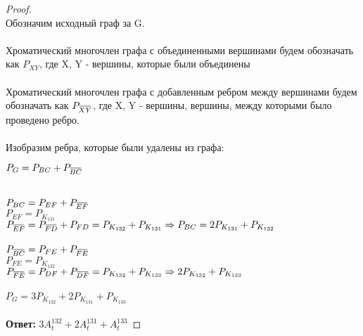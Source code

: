 \newcommand{\ols}[1]{\mskip.5\thinmuskip\overline{\mskip-.5\thinmuskip {#1} \mskip-.5\thinmuskip}\mskip.5\thinmuskip} %

\begin{proof} $ $\\
    Обозначим исходный граф за G.\\\\
    Хроматический многочлен графа с объединенными вершинами будем обозначать как $P_{XY}$, где X, Y - вершины, которые были объединены\\\\
    Хроматический многочлен графа с добавленным ребром между вершинами будем обозначать как $P_{\ols{XY}}$, где X, Y - вершины, вершины, между которыми было проведено ребро.\\\\
    Изобразим ребра, которые были удалены из графа:
    \begin{center}
    \end{center}
    $P_G = P_{BC} + P_{\ols{BC}}$\\
    \\
    $P_{BC} = P_{EF} + P_{\ols{EF}}$\\
    $P_{EF} = P_{K_{131}}$\\
    $P_{\ols{EF}} = P_{\ols{FD}} + P_{FD} = P_{K_{132}} + P_{K_{131}} \Rightarrow P_{BC} = 2P_{K_{131}}+P_{K_{132}}$\\\\
    $P_{\ols{BC}} = P_{FE} + P_{\ols{FE}}$\\
    $P_{FE} = P_{K_{132}}$\\
    $P_{\ols{FE}} = P_{DF} + P_{\ols{DF}} = P_{K_{132}} + P_{K_{133}} \Rightarrow 2P_{K_{132}}+P_{K_{133}}$\\\\
    $P_G = 3P_{K_{132}} + 2P_{K_{131}} + P_{K_{133}}$\\\\
    \textbf{Ответ:} $3A_t^{132} + 2A_t^{131} + A_t^{133}$
\end{proof}